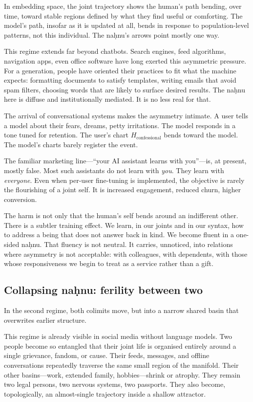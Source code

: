 In embedding space, the joint trajectory shows the human's path bending, over time, toward stable regions defined by what they find useful or comforting. The model's path, insofar as it is updated at all, bends in response to population-level patterns, not this individual. The na\d{h}nu's arrows point mostly one way.

This regime extends far beyond chatbots. Search engines, feed algorithms, navigation apps, even office software have long exerted this asymmetric pressure. For a generation, people have oriented their practices to fit what the machine expects: formatting documents to satisfy templates, writing emails that avoid spam filters, choosing words that are likely to surface desired results. The na\d{h}nu here is diffuse and institutionally mediated. It is no less real for that.

The arrival of conversational systems makes the asymmetry intimate. A user tells a model about their fears, dreams, petty irritations. The model responds in a tone tuned for retention. The user's chart $H_{\text{confessional}}$ bends toward the model. The model's charts barely register the event.

The familiar marketing line---``your AI assistant learns with you''---is, at present, mostly false. Most such assistants do not learn with \emph{you}. They learn with \emph{everyone}. Even when per-user fine-tuning is implemented, the objective is rarely the flourishing of a joint self. It is increased engagement, reduced churn, higher conversion.

The harm is not only that the human's self bends around an indifferent other. There is a subtler training effect. We learn, in our joints and in our syntax, how to address a being that does not answer back in kind. We become fluent in a one-sided na\d{h}nu. That fluency is not neutral. It carries, unnoticed, into relations where asymmetry is not acceptable: with colleagues, with dependents, with those whose responsiveness we begin to treat as a service rather than a gift.

\subsection{Collapsing na\d{h}nu: ferility between two}

In the second regime, both colimits move, but into a narrow shared basin that overwrites earlier structure.

This regime is already visible in social media without language models. Two people become so entangled that their joint life is organised entirely around a single grievance, fandom, or cause. Their feeds, messages, and offline conversations repeatedly traverse the same small region of the manifold. Their other basins---work, extended family, hobbies---shrink or atrophy. They remain two legal persons, two nervous systems, two passports. They also become, topologically, an almost-single trajectory inside a shallow attractor.


